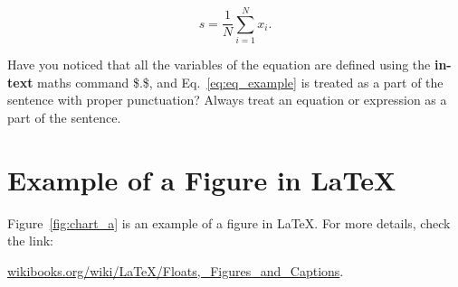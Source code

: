 \begin{equation}
\label{eq:eq_example} %
s = \frac{1}{N} \sum_{i = 1}^{N} x_i. 
\end{equation}

Have you noticed that all the variables of the equation are defined using the \textbf{in-text} maths command \$.\$, and Eq.~\eqref{eq:eq_example} is treated as a part of the sentence with proper punctuation? Always treat an equation or expression as a part of the sentence. 



\section{Example of a Figure in \LaTeX}
Figure~\ref{fig:chart_a} is an example of a figure in \LaTeX. For more details, check the link:

\href{https://en.wikibooks.org/wiki/LaTeX/Floats,_Figures_and_Captions}{wikibooks.org/wiki/LaTeX/Floats,\_Figures\_and\_Captions}.

